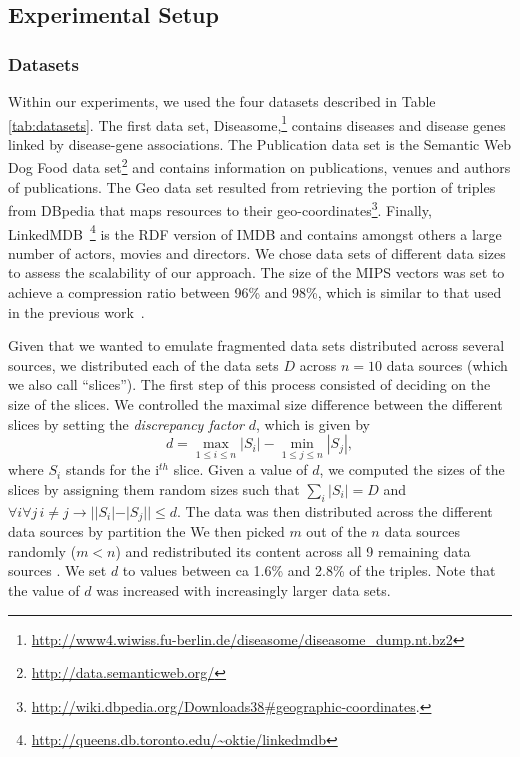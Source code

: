 \documentclass{sig-alternate}  %
\begin{document}
\subsection{Experimental Setup}

\subsubsection{Datasets}
Within our experiments, we used the four datasets described in Table \ref{tab:datasets}.
The first data set, Diseasome,\footnote{\url{http://www4.wiwiss.fu-berlin.de/diseasome/diseasome_dump.nt.bz2}} contains diseases and disease genes linked by disease-gene associations.
The Publication data set is the Semantic Web Dog Food data set\footnote{\url{http://data.semanticweb.org/}} and contains information on publications, venues and authors of publications.
The Geo data set resulted from retrieving the portion of triples from DBpedia that maps resources to their geo-coordinates\footnote{\url{http://wiki.dbpedia.org/Downloads38\#geographic-coordinates}.}.
Finally, LinkedMDB~\footnote{\url{http://queens.db.toronto.edu/~oktie/linkedmdb}} is the RDF version of IMDB and contains amongst others a large number of actors, movies and directors.
We chose data sets of different data sizes to assess the scalability of our approach.
The size of the MIPS vectors was set to achieve a compression ratio between 96\% and 98\%, which is similar to that used in the previous work~\cite{key-5}.

Given that we wanted to emulate fragmented data sets distributed across several sources, we distributed each of the data sets $D$ across $n=10$ data sources (which we also call ``slices'').
The first step of this process consisted of deciding on the size of the slices.
We controlled the maximal size difference between the different slices by setting the \emph{discrepancy factor} $d$, which is given by
\begin{equation}
d = \max\limits_{1 \leq i \leq n} |S_i| - \min\limits_{1 \leq j \leq n} |S_j|,
\end{equation}
where $S_i$ stands for the i$^{th}$ slice. 
Given a value of $d$, we computed the sizes of the slices by assigning them random sizes such that $\sum\limits_{i} |S_i| = D$ and $\forall i \forall j\,i \neq j \rightarrow ||S_i| - |S_j|| \leq d$.
The data was then distributed across the different data sources by partition the  
We then picked $m$ out of the $n$ data sources randomly ($m < n$) and redistributed its content across all 9 remaining data sources .
We set $d$ to values between ca 1.6\% and 2.8\% of the triples.
Note that the value of $d$ was increased with increasingly larger data sets.
\end{document}
